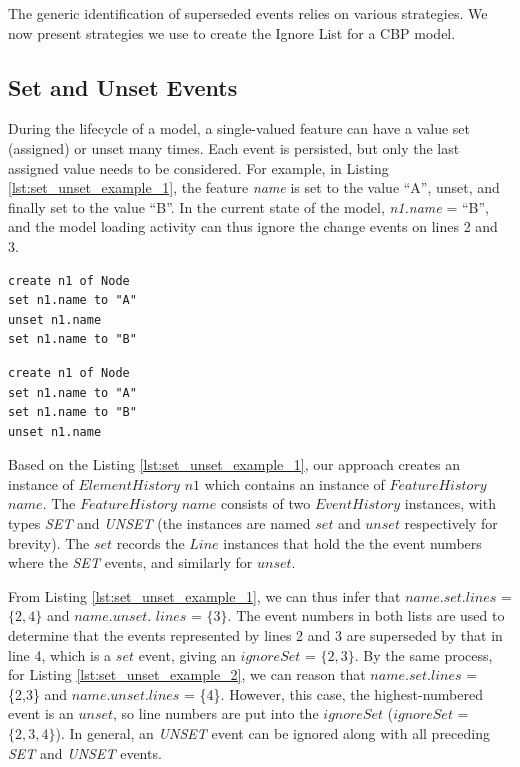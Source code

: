 \documentclass{llncs}
\begin{document}
    The generic identification of superseded events relies on various strategies.  We now present strategies we use to create the Ignore List for a CBP model. 

    \subsection{Set and Unset Events}
    \label{subsec:set_and_unset_operations}
    During the lifecycle of a model, a single-valued feature can have a value set (assigned) or unset many times.  Each event is persisted, but only the last assigned value needs to be considered. For example, in Listing \ref{lst:set_unset_example_1}, the feature \emph{name} is set to the value ``A'', unset, and finally set to the value ``B''.  In the current state of the model, \emph{n1.name} = ``B'', and the model loading activity can thus ignore the change events on lines 2 and 3. 
    
    \noindent
    \begin{minipage}[t]{0.49\linewidth}
\begin{lstlisting}[style=eol,caption={A CBP representation of attribute \emph{name} assignments.},label=lst:set_unset_example_1]
create n1 of Node
set n1.name to "A"
unset n1.name
set n1.name to "B"
\end{lstlisting}
    \end{minipage}
    \hfill
    \begin{minipage}[t]{0.49\linewidth}
\begin{lstlisting}[style=eol,caption={A CBP representation of attribute \emph{name} assignments.},label=lst:set_unset_example_2]
create n1 of Node
set n1.name to "A"
set n1.name to "B"
unset n1.name
\end{lstlisting}
    \end{minipage}
    
    Based on the Listing \ref{lst:set_unset_example_1}, our approach creates an instance of $ElementHistory$ $n1$ which contains an instance of $FeatureHistory$ $name$. The $FeatureHistory$ $name$ consists of two $EventHistory$ instances, with types \textit{SET} and \textit{UNSET} (the instances are named $set$ and $unset$ respectively for brevity). The $set$ records the $Line$ instances that hold the the event numbers where the \textit{SET} events, and similarly for $unset$.
    
    From Listing \ref{lst:set_unset_example_1}, we can thus infer that $name$.$set$.$lines$ = $\{2,4\}$ and $name$.$unset$. $lines$ = $\{3\}$. The event numbers in both lists are used to determine that the events represented by lines 2 and 3 are superseded by that in line 4, which is a $set$ event, giving an $ignoreSet$ = $\{2, 3\}$.  By the same process, for Listing \ref{lst:set_unset_example_2}, we can reason that $name$.$set$.$lines$ = \{2,3\} and $name$.$unset$.$lines$ = \{4\}.  However, this case, the highest-numbered event is an $unset$, so line numbers are put into the $ignoreSet$ ($ignoreSet$ = $\{2, 3, 4\}$). In general, an \textit{UNSET} event can be ignored along with all preceding \textit{SET} and \textit{UNSET} events. 
    
\end{document}
